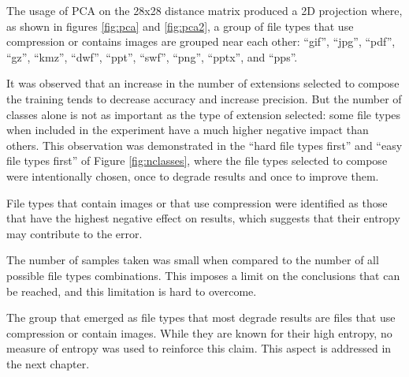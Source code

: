 
The usage of PCA on the 28x28 distance matrix produced a 2D projection where, as shown in figures \ref{fig:pca} and \ref{fig:pca2}, a group of file types that use compression or contains images are grouped near each other: 
``gif'',
``jpg'',
``pdf'',
``gz'',
``kmz'',
``dwf'',
``ppt'',
``swf'',
``png'',
``pptx'',
and ``pps''.

It was observed that an increase in the number of extensions selected to compose the training tends to decrease accuracy and increase precision. But the number of classes alone is not as important as the type of extension selected: some file types when included in the experiment have a much higher negative impact than others. This observation was demonstrated in the ``hard file types first'' and ``easy file types first'' of Figure \ref{fig:nclasses}, where the file types selected to compose were intentionally chosen, once to degrade results and once to improve them.

File types that contain images or that use compression were identified as those that have the highest negative effect on results, which suggests that their entropy may contribute to the error.

The number of samples taken was small when compared to the number of all possible file types combinations. This imposes a limit on the conclusions that can be reached, and this limitation is hard to overcome.

The group that emerged as file types that most degrade results are files that use compression or contain images. While they are known for their high entropy, no measure of entropy was used to reinforce this claim.
This aspect is addressed in the next chapter.

